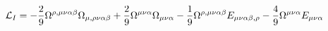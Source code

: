 \begin{equation}
{\cal L}_I = - \frac{2}{9} \Omega^{\rho,\mu\nu\alpha\beta}
\Omega_{\mu,\rho\nu\alpha\beta} + \frac{2}{9} \Omega^{\mu\nu\alpha}
\Omega_{\mu\nu\alpha} - \frac{1}{9} \Omega^{\rho,\mu\nu\alpha\beta}
E_{\mu\nu\alpha\beta,\rho} - \frac{4}{9} \Omega^{\mu\nu\alpha}
E_{\mu\nu\alpha}
\end{equation}

